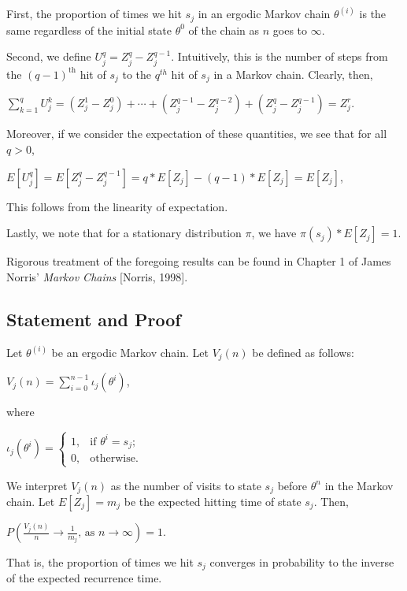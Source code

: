 \documentclass[12pt,twoside]{reedthesis}
\begin{document}
		First, the proportion of times we hit $s_j$ in an ergodic Markov chain $\theta^{(i)}$ is the same regardless of the initial state $\theta^0$ of the chain as $n$ goes to $\infty$.
		
		Second, we define $U_{j}^q = Z_{j}^{q} - Z_{j}^{q-1}$. 
		Intuitively, this is the number of steps from the  $(q-1)^{\textrm{th}}$ hit of $s_j$ to the $q^{th}$ hit of $s_j$ in a Markov chain. 
		Clearly, then,
		\begin{center}
		 $\displaystyle\sum_{k=1}^{q}U_j^k 
		 = (Z_j^1 - Z_j^0) + \cdots + (Z_j^{q-1} - Z_j^{q-2}) + (Z_j^q - Z_j^{q-1}) 
		 = Z_j^r$. 
		 \end{center}
		 Moreover, if we consider the expectation of these quantities, we see that for all $q > 0$,
		\begin{center}
		$E[U_{j}^q] = E[Z_j^{q} - Z_j^{q-1}] = q*E[Z_j] - (q-1) *E[Z_j] = E[Z_j]$, 
		\end{center}
		This follows from the linearity of expectation.
		
		Lastly, we note that for a stationary distribution $\pi$, we have $\pi(s_j)*E[Z_j] = 1$.
		
		Rigorous treatment of the foregoing results can be found in Chapter 1 of James Norris' {\em Markov Chains} [Norris, 1998]. 
		\subsection*{Statement and Proof}
		\begin{theorem}
		Let $\theta^{(i)}$ be an ergodic Markov chain. 
		Let $V_j(n)$ be defined as follows:
		\begin{center}
			$V_j(n) = \displaystyle\sum_{i=0}^{n-1} \iota_j(\theta^{i})$,
		\end{center}
		where
		\begin{center}
			$\iota_j(\theta^i) = \begin{cases} 
				1, & \textrm{if\ \ \ } \theta^i = s_j; \\
				0, & \textrm{otherwise}. 
				\end{cases}
			$
		\end{center}
		We interpret $V_j(n)$ as the number of visits to state $s_j$ before $\theta^n$ in the Markov chain. 
		Let $E[Z_j] = m_j$ be the expected hitting time of state $s_j$. Then,
		\begin{center}
			$P\left(\displaystyle\frac{V_j(n)}{n} \longrightarrow \frac{1}{m_j}
			\textrm{, as } n \rightarrow \infty \right) = 1$.
		\end{center}
		
		That is, the proportion of times we hit $s_j$ converges in probability to the inverse of the expected recurrence time.
		\end{theorem}
		
\end{document}
